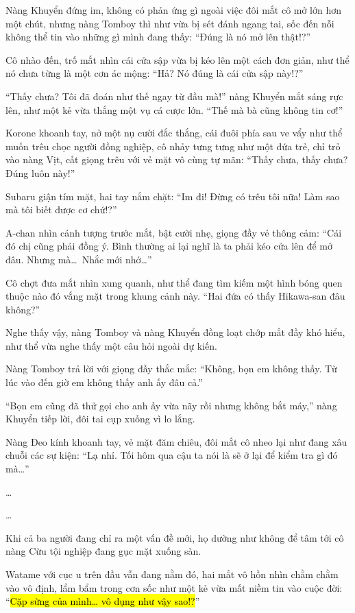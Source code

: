 \documentclass[../main.tex]{subfiles}
\begin{document}
Nàng Khuyển đứng im, không có phản ứng gì ngoài việc đôi mắt cô mở lớn hơn một chút, nhưng nàng Tomboy thì như vừa bị sét đánh ngang tai, sốc đến nỗi không thể tin vào những gì mình đang thấy: ``Đúng là nó mở lên thật!?''


Cô nhào đến, trố mắt nhìn cái cửa sập vừa bị kéo lên một cách đơn giản, như thể nó chưa từng là một cơn ác mộng: ``Hả? Nó đúng là cái cửa sập này!?''

``Thấy chưa? Tôi đã đoán như thế ngay từ đầu mà!'' nàng Khuyển mắt sáng rực lên, như một kẻ vừa thắng một vụ cá cược lớn. ``Thế mà bà cũng không tin cơ!''

Korone khoanh tay, nở một nụ cười đắc thắng, cái đuôi phía sau ve vẩy như thể muốn trêu chọc người đồng nghiệp, cô nhảy tưng tưng như một đứa trẻ, chỉ trỏ vào nàng Vịt, cất giọng trêu với vẻ mặt vô cùng tự mãn: ``Thấy chưa, thấy chưa? Đúng luôn này!''

Subaru giận tím mặt, hai tay nắm chặt: ``Im đi! Đừng có trêu tôi nữa! Làm sao mà tôi biết được cơ chứ!?''

A-chan nhìn cảnh tượng trước mắt, bật cười nhẹ, giọng đầy vẻ thông cảm: ``Cái đó chị cũng phải đồng ý. Bình thường ai lại nghĩ là ta phải kéo cửa lên để mở đâu. Nhưng mà\dots\ Nhắc mới nhớ\dots''

Cô chợt đưa mắt nhìn xung quanh, như thể đang tìm kiếm một hình bóng quen thuộc nào đó vắng mặt trong khung cảnh này. ``Hai đứa có thấy Hikawa-san đâu không?''

Nghe thấy vậy, nàng Tomboy và nàng Khuyển đồng loạt chớp mắt đầy khó hiểu, như thể vừa nghe thấy một câu hỏi ngoài dự kiến.

Nàng Tomboy trả lời với giọng đầy thắc mắc: ``Không, bọn em không thấy. Từ lúc vào đến giờ em không thấy anh ấy đâu cả.''

``Bọn em cũng đã thử gọi cho anh ấy vừa nãy rồi nhưng không bắt máy,'' nàng Khuyển tiếp lời, đôi tai cụp xuống vì lo lắng.

Nàng Đeo kính khoanh tay, vẻ mặt đăm chiêu, đôi mắt cô nheo lại như đang xâu chuỗi các sự kiện: ``Lạ nhỉ. Tối hôm qua cậu ta nói là sẽ ở lại để kiểm tra gì đó mà\dots''

\dots

\dots

Khi cả ba người đang chỉ ra một vấn đề mới, họ dường như không để tâm tới cô nàng Cừu tội nghiệp đang gục mặt xuống sàn.

Watame với cục u trên đầu vẫn đang nằm đó, hai mắt vô hồn nhìn chằm chằm vào vô định, lẩm bẩm trong cơn sốc như một kẻ vừa mất niềm tin vào cuộc đời: ``\hl{Cặp sừng của mình\dots{} vô dụng như vậy sao!?}''
\end{document}

